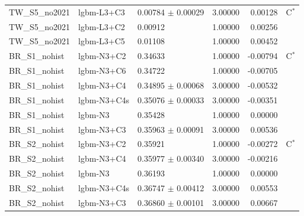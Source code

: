 \begin{tabular}{lllrrl}
TW\_S5\_no2021 & lgbm-L3+C3 & 0.00784 $\pm$ 0.00029 & 3.00000 & 0.00128 & C$^{*}$ \\
TW\_S5\_no2021 & lgbm-L3+C2 & 0.00912 & 1.00000 & 0.00256 &  \\
TW\_S5\_no2021 & lgbm-L3+C5 & 0.01108 & 1.00000 & 0.00452 &  \\
BR\_S1\_nohist & lgbm-N3+C2 & 0.34633 & 1.00000 & -0.00794 & C$^{*}$ \\
BR\_S1\_nohist & lgbm-N3+C6 & 0.34722 & 1.00000 & -0.00705 &  \\
BR\_S1\_nohist & lgbm-N3+C4 & 0.34895 $\pm$ 0.00068 & 3.00000 & -0.00532 &  \\
BR\_S1\_nohist & lgbm-N3+C4s & 0.35076 $\pm$ 0.00033 & 3.00000 & -0.00351 &  \\
BR\_S1\_nohist & lgbm-N3 & 0.35428 & 1.00000 & 0.00000 &  \\
BR\_S1\_nohist & lgbm-N3+C3 & 0.35963 $\pm$ 0.00091 & 3.00000 & 0.00536 &  \\
BR\_S2\_nohist & lgbm-N3+C2 & 0.35921 & 1.00000 & -0.00272 & C$^{*}$ \\
BR\_S2\_nohist & lgbm-N3+C4 & 0.35977 $\pm$ 0.00340 & 3.00000 & -0.00216 &  \\
BR\_S2\_nohist & lgbm-N3 & 0.36193 & 1.00000 & 0.00000 &  \\
BR\_S2\_nohist & lgbm-N3+C4s & 0.36747 $\pm$ 0.00412 & 3.00000 & 0.00553 &  \\
BR\_S2\_nohist & lgbm-N3+C3 & 0.36860 $\pm$ 0.00101 & 3.00000 & 0.00667 &  \\
\bottomrule
\end{tabular}
